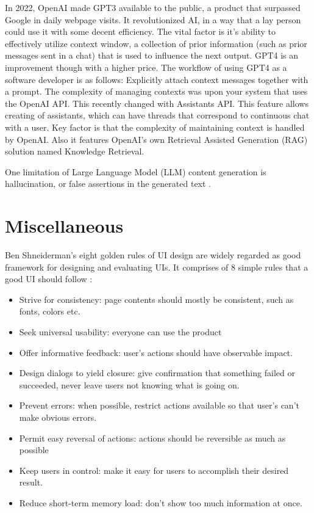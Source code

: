  In 2022, OpenAI made GPT3 available to the public, a product that surpassed Google in daily webpage visits. It revolutionized AI, in a way that a lay person could use it with some decent efficiency. The vital factor is it's ability to effectively utilize context window, a collection of prior information (such as prior messages sent in a chat) that is used to influence the next output. GPT4 is an improvement though with a higher price. The workflow of using GPT4 as a software developer is as follows: Explicitly attach context messages together with a prompt. The complexity of managing contexts was upon your system that uses the OpenAI API. This recently changed with Assistants API. This feature allows creating of assistants, which can have threads that correspond to continuous chat with a user. Key factor is that the complexity of maintaining context is handled by OpenAI. Also it features OpenAI's own Retrieval Assisted Generation (RAG) solution named Knowledge Retrieval. 

 One limitation of Large Language Model (LLM) content generation is hallucination, or false assertions in the generated text \cite{ji2023survey}.

\section{Miscellaneous}
\label{section:goldenRules}
Ben Shneiderman's eight golden rules of UI design are widely regarded as good framework for designing and evaluating UIs. It comprises of 8 simple rules that a good UI should follow \cite{goldenRulesUI}: \begin{itemize}
    \item Strive for consistency: page contents should mostly be consistent, such as fonts, colors etc. 
    \item Seek universal usability: everyone can use the product
    \item Offer informative feedback: user's actions should have observable impact.
    \item Design dialogs to yield closure: give confirmation that something failed or succeeded, never leave users not knowing what is going on.
    \item Prevent errors: when possible, restrict actions available so that user's can't make obvious errors.
    \item Permit easy reversal of actions: actions should be reversible as much as possible
    \item Keep users in control: make it easy for users to accomplish their desired result.
    \item Reduce short-term memory load: don't show too much information at once.
\end{itemize}


